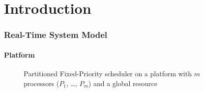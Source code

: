 


\section{Introduction}

	\begin{frame}
	\frametitle{Real-Time System Model}
	\framesubtitle{Platform}	

		\begin{figure}
			\centering
			\scalebox{.8}{\mrspSlide}
			\caption{Partitioned Fixed-Priority scheduler on a platform with $m$ processors ($P_1$, \dots, $P_m$) and a global resource}
		\end{figure}

	\end{frame}